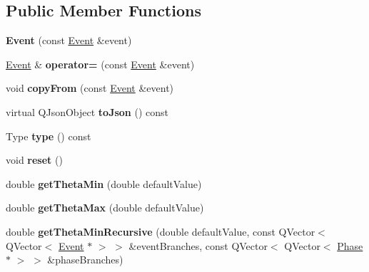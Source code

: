 \subsection*{Public Member Functions}
\begin{DoxyCompactItemize}
\item 
\hypertarget{class_event_ae8b35bf9237b74824194f87128e4fdab}{{\bfseries Event} (const \hyperlink{class_event}{Event} \&event)}\label{class_event_ae8b35bf9237b74824194f87128e4fdab}

\item 
\hypertarget{class_event_af37245d358792cdef34ff4c76c74c022}{\hyperlink{class_event}{Event} \& {\bfseries operator=} (const \hyperlink{class_event}{Event} \&event)}\label{class_event_af37245d358792cdef34ff4c76c74c022}

\item 
\hypertarget{class_event_adea19c34edfe0d6c5200f30932f366cc}{void {\bfseries copy\-From} (const \hyperlink{class_event}{Event} \&event)}\label{class_event_adea19c34edfe0d6c5200f30932f366cc}

\item 
\hypertarget{class_event_a6cb4b1992b2ba0535f91380779d0250a}{virtual Q\-Json\-Object {\bfseries to\-Json} () const }\label{class_event_a6cb4b1992b2ba0535f91380779d0250a}

\item 
\hypertarget{class_event_a3374e4bfa67f87e90cd075d827335c73}{Type {\bfseries type} () const }\label{class_event_a3374e4bfa67f87e90cd075d827335c73}

\item 
\hypertarget{class_event_a149bd3fe9d4ab548a17d684b30283c87}{void {\bfseries reset} ()}\label{class_event_a149bd3fe9d4ab548a17d684b30283c87}

\item 
\hypertarget{class_event_aad9956846b1bc124710301aaa62b507f}{double {\bfseries get\-Theta\-Min} (double default\-Value)}\label{class_event_aad9956846b1bc124710301aaa62b507f}

\item 
\hypertarget{class_event_a7fce906447ebd69d4705b922a78fbfcc}{double {\bfseries get\-Theta\-Max} (double default\-Value)}\label{class_event_a7fce906447ebd69d4705b922a78fbfcc}

\item 
\hypertarget{class_event_aba7090c9a6a70d373e43ffab32c8f38d}{double {\bfseries get\-Theta\-Min\-Recursive} (double default\-Value, const Q\-Vector$<$ Q\-Vector$<$ \hyperlink{class_event}{Event} $\ast$ $>$ $>$ \&event\-Branches, const Q\-Vector$<$ Q\-Vector$<$ \hyperlink{class_phase}{Phase} $\ast$ $>$ $>$ \&phase\-Branches)}\label{class_event_aba7090c9a6a70d373e43ffab32c8f38d}


\end{DoxyCompactItemize}
